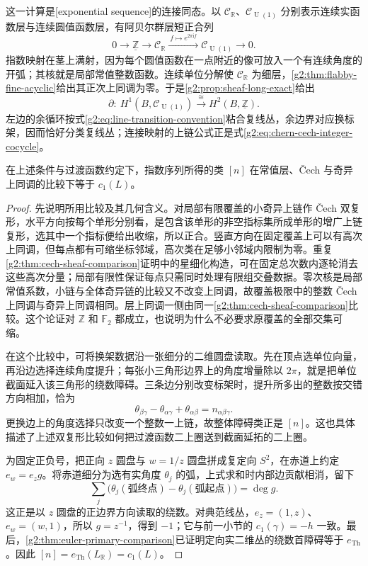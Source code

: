 这一计算是[exponential sequence]的连接同态。以 \(\mathcal C_{\mathbb R}\)、\(\mathcal C_{\operatorname U(1)}\) 分别表示连续实函数层与连续圆值函数层，有阿贝尔群层短正合列
\begin{equation}\label{g2:eq:line-exponential-sequence}
	0\longrightarrow\underline{\mathbb Z}\longrightarrow\mathcal C_{\mathbb R}
	\xrightarrow{\ f\mapsto e^{2\pi\mathrm i f}\ }\mathcal C_{\operatorname U(1)}\longrightarrow0.
\end{equation}
指数映射在茎上满射，因为每个圆值函数在一点附近的像可放入一个有连续角度的开弧；其核就是局部常值整数函数。连续单位分解使 \(\mathcal C_{\mathbb R}\) 为细层，\cref{g2:thm:flabby-fine-acyclic}给出其正次上同调为零。于是\cref{g2:prop:sheaf-long-exact}给出
\[
	\partial:\ H^1(B,\mathcal C_{\operatorname U(1)})\xrightarrow{\ \cong\ }H^2(B,\underline{\mathbb Z}).
\]
左边的余循环按式\eqref{g2:eq:line-transition-convention}粘合复线丛，余边界对应换标架，因而恰好分类复线丛；连接映射的上链公式正是式\eqref{g2:eq:chern-cech-integer-cocycle}。

\begin{proposition}\label{g2:prop:chern-transition-comparison}
	在上述条件与过渡函数约定下，指数序列所得的类 \([n]\) 在常值层、Čech 与奇异上同调的比较下等于 \(c_1(L)\)。
\end{proposition}
\begin{proof}
	先说明所用比较及其几何含义。对局部有限覆盖的小奇异上链作 Čech 双复形，水平方向按每个单形分别看，是包含该单形的非空指标集所成单形的增广上链复形，选其中一个指标便给出收缩，所以正合。竖直方向在固定覆盖上可以有高次上同调，但每点都有可缩坐标邻域，高次类在足够小邻域内限制为零。重复\cref{g2:thm:cech-sheaf-comparison}证明中的星细化构造，可在固定总次数内逐轮消去这些高次分量；局部有限性保证每点只需同时处理有限组交叠数据。零次核是局部常值系数，小链与全体奇异链的比较又不改变上同调，故覆盖极限中的整数 Čech 上同调与奇异上同调相同。层上同调一侧由同一\cref{g2:thm:cech-sheaf-comparison}比较。这个论证对 \(\mathbb Z\) 和 \(\mathbb F_2\) 都成立，也说明为什么不必要求原覆盖的全部交集可缩。

	在这个比较中，可将换架数据沿一张细分的二维圆盘读取。先在顶点选单位向量，再沿边选择连续角度提升；每张小三角形边界上的角度增量除以 \(2\pi\)，就是把单位截面延入该三角形的绕数障碍。三条边分别改变标架时，提升所多出的整数按交错方向相加，恰为
	\[
		\theta_{\beta\gamma}-\theta_{\alpha\gamma}+\theta_{\alpha\beta}=n_{\alpha\beta\gamma}.
	\]
	更换边上的角度选择只改变一个整数一上链，故整体障碍类正是 \([n]\)。这也具体描述了上述双复形比较如何把过渡函数二上圈送到截面延拓的二上圈。

	为固定正负号，把正向 \(z\) 圆盘与 \(w=1/z\) 圆盘拼成复定向 \(S^2\)，在赤道上约定 \(e_w=e_z g\)。将赤道细分为选有实角度 \(\theta_j\) 的弧，上式求和时内部边贡献相消，留下
	\[
		\sum_j\bigl(\theta_j(\text{弧终点})-\theta_j(\text{弧起点})\bigr)=\deg g.
	\]
	这正是以 \(z\) 圆盘的正边界方向读取的绕数。对典范线丛，\(e_z=(1,z)\)、\(e_w=(w,1)\)，所以 \(g=z^{-1}\)，得到 \(-1\)；它与前一小节的 \(c_1(\gamma)=-h\) 一致。最后，\cref{g2:thm:euler-primary-comparison}已证明定向实二维丛的绕数首障碍等于 \(e_{\mathrm{Th}}\)。因此 \([n]=e_{\mathrm{Th}}(L_{\mathbb R})=c_1(L)\)。
\end{proof}

